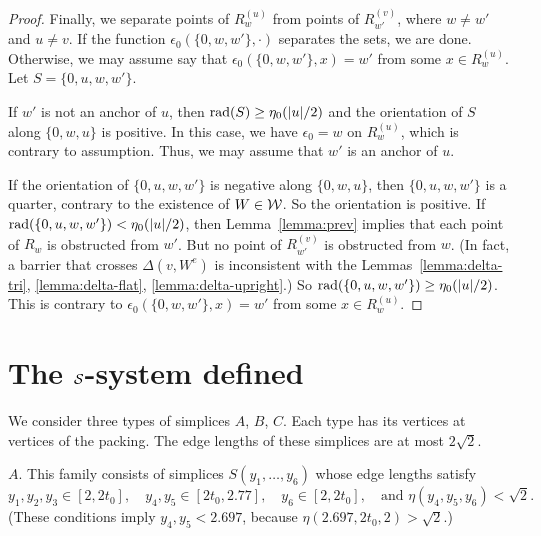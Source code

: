 \begin{proof}
Finally, we separate points of $R_w^{(u)}$ from points of
$R_{w'}^{(v)}$, where $w\ne w'$ and $u\ne v$.  If the function
$\epsilon_0(\{0,w,w'\},\cdot)$ separates the sets, we are done.
Otherwise, we may assume say that $\epsilon_0(\{0,w,w'\},x) = w'$
from some $x\in R_w^{(u)}$.  Let $S=\{0,u,w,w'\}$.

If $w'$ is not an anchor of $u$, then $\operatorname{rad}(S) \ge\eta_0(|u|/2)$
and the orientation of $S$ along $\{0,w,u\}$ is positive.  In this
case, we have $\epsilon_0 = w$ on $R_w^{(u)}$, which is contrary
to assumption. Thus, we may assume that $w'$ is an anchor of $u$.

If the orientation of $\{0,u,w,w'\}$ is negative along
$\{0,w,u\}$, then $\{0,u,w,w'\}$ is a quarter, contrary to the
existence of $W\in {\mathcal W}$.  So the orientation is positive.  If
$\operatorname{rad}(\{0,u,w,w'\}) < \eta_0(|u|/2)$, then Lemma~\ref{lemma:prev}
implies that each point of $R_w$ is obstructed from $w'$.  But no
point of $R_{w'}^{(v)}$ is obstructed from $w$. (In fact, a
barrier that crosses $\Delta(v,W^e)$ is inconsistent with the
Lemmas~\ref{lemma:delta-tri}, \ref{lemma:delta-flat},
\ref{lemma:delta-upright}.) So $\operatorname{rad}(\{0,u,w,w'\}) \ge
\eta_0(|u|/2)$.  This is contrary to $\epsilon_0(\{0,w,w'\},x) =
w'$ from some $x\in R_w^{(u)}$.
\end{proof}


\section{The ${\mathcal S}$-system defined}

We consider three types of simplices $A$, $B$, $C$.  Each type has
its vertices at vertices of the packing.  The edge lengths of
these simplices are at most $2\sqrt{2}$.

$A$.  This family consists of simplices $S(y_1,\ldots,y_6)$ whose
edge lengths satisfy
    $$
    y_1,y_2,y_3\in[2,2t_0],\quad
    y_4,y_5\in[2t_0,2.77],
    \quad
    y_6\in[2,2t_0],\quad \text{and }
    \eta(y_4,y_5,y_6)<\sqrt{2}.
    $$
(These conditions imply $y_4,y_5<2.697$, because
$\eta(2.697,2t_0,2)>\sqrt2$.)

